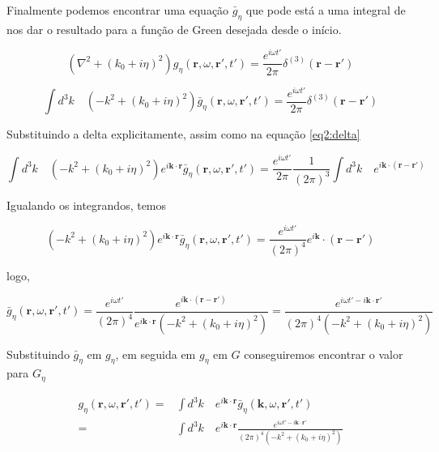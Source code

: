 Finalmente podemos encontrar uma equação $\bar{g}_\eta$ que pode está a uma integral de nos dar o resultado para a função de Green desejada desde o início.

\begin{equation}
	\left( \nabla^2 + (k_0+i\eta)^2\right) g_{\eta}(\textbf{r},\omega, \textbf{r}', t') 
	= \frac{e^{i\omega t'}}{2\pi}\delta^{(3)}(\textbf{r}-\textbf{r}')
\end{equation}

\begin{equation}
	\int d^3 k \quad \left( -k^2 + (k_0+i\eta)^2\right) \bar{g}_{\eta}(\textbf{r},\omega, \textbf{r}', t') 
	= \frac{e^{i\omega t'}}{2\pi}\delta^{(3)}(\textbf{r}-\textbf{r}')
\end{equation}

Substituindo a delta explicitamente, assim como na equação \ref{eq2:delta}

\begin{equation}
	\int d^3 k \quad \left( -k^2 + (k_0+i\eta)^2\right) e^{i\textbf{k}\cdot\textbf{r}}\bar{g}_{\eta}(\textbf{r},\omega, \textbf{r}', t') 
	= \frac{e^{i\omega t'}}{2\pi}\frac{1}{(2\pi)^3} \int d^3k \quad e^{i\textbf{k}\cdot(\textbf{r}-\textbf{r}')}
\end{equation}

Igualando os integrandos, temos

\begin{equation}
	\left( -k^2 + (k_0+i\eta)^2\right) e^{i\textbf{k}\cdot\textbf{r}} \bar{g}_{\eta}(\textbf{r},\omega, \textbf{r}', t') = \frac{e^{i\omega t'}}{(2\pi)^4}e^{i\textbf{k}}\cdot(\textbf{r}-\textbf{r}')
\end{equation}

logo,

\begin{equation}
	 \bar{g}_{\eta}(\textbf{r},\omega, \textbf{r}', t') = \frac{e^{i\omega t'}}{(2\pi)^4}\frac{e^{i\textbf{k}\cdot(\textbf{r}-\textbf{r}')}}{e^{i\textbf{k}\cdot\textbf{r}} \left( -k^2 + (k_0+i\eta)^2\right)} = \frac{e^{i\omega t'-i\textbf{k}\cdot\textbf{r}'}}{(2\pi)^4\left( -k^2 + (k_0+i\eta)^2\right)}
\end{equation}

Substituindo $\bar{g}_\eta$ em $g_{\eta}$, em seguida em $g_{\eta}$ em $G$ conseguiremos encontrar o valor para $G_{\eta}$

\begin{equation}
	\begin{split}
	g_{\eta}(\textbf{r}, \omega, \textbf{r}', t') = &
	\int d^3k \quad e^{i\textbf{k}\cdot\textbf{r}}\bar{g}_{\eta}(\textbf{k}, \omega, \textbf{r}', t') \\
	= & \int d^3k \quad e^{i\textbf{k}\cdot\textbf{r}} \frac{e^{i\omega t'-i\textbf{k}\cdot\textbf{r}'}}{(2\pi)^4\left( -k^2 + (k_0+i\eta)^2\right)}
	\end{split}
\end{equation}

